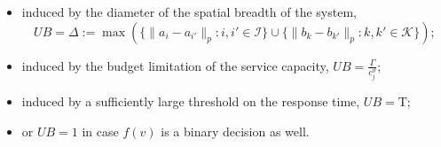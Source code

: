 \documentclass[a4paper,11pt,reqno]{amsart}
\newcommand{\K}{\mathcal{K}}
\newcommand{\I}{\mathcal{I}}
\newcommand{\T}{\mathrm{T}}
\begin{document}
\begin{itemize}
    \item[--] induced by the diameter of the spatial breadth of the system, $$UB=\Delta:= \max(\{\|a_i-a_{i'}\|_p : i,i'\in \I\}\cup \{\|b_k-b_{k'}\|_p : k,k'\in \K\});$$ 

    \item[--] induced by the budget limitation of the service capacity, $UB=\frac{\Gamma}{c^\vartheta_j}$;

    \item[--] induced by a sufficiently large threshold on the response time, $UB=\T$;

    \item[--] or $UB=1$ in case $f(v)$ is a binary decision as well.
\end{itemize}
\end{document}
